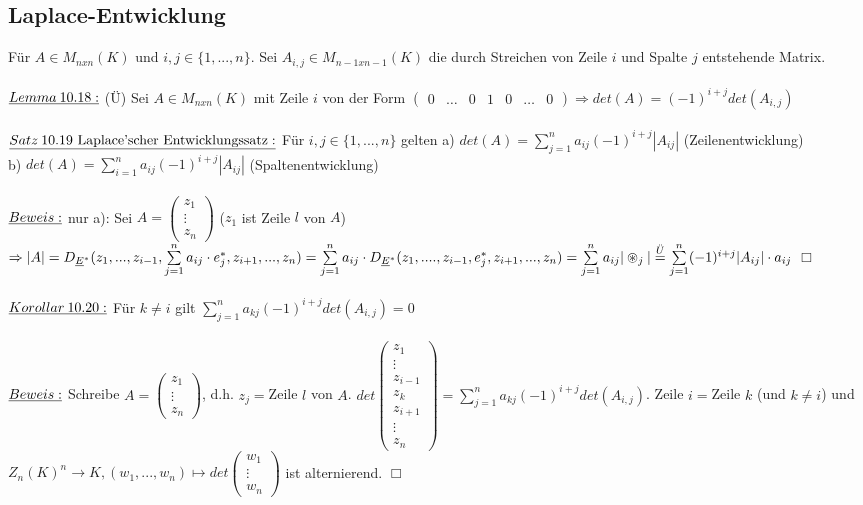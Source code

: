 \documentclass[fleqn, a4paper, 11pt]{article}
\begin{document}
\subsection{Laplace-Entwicklung}

F\"ur $A\in M_{nxn}(K)$ und $i,j\in\{1,...,n\}$. Sei $A_{i,j}\in M_{n-1xn-1}(K)$ die durch Streichen von Zeile $i$ und Spalte $j$ entstehende Matrix.\\
\\
$\uline{Lemma\:10.18:}$ (\"U) Sei $A\in M_{nxn}(K)$ mit Zeile $i$ von der Form $\begin{pmatrix}
	0 & \dots & 0 & 1 & 0 & \dots & 0
\end{pmatrix}\Rightarrow det(A)=(-1)^{i+j}det(A_{i,j})$\\
\\
$\uline{Satz\:10.19\text{ Laplace'scher Entwicklungssatz}:}$ F\"ur $i,j\in\{1,...,n\}$ gelten a) $det(A)=\sum\limits_{j=1}^n a_{ij}(-1)^{i+j}|A_{ij}|$ (Zeilenentwicklung)\\
b) $det(A)=\sum\limits_{i=1}^n a_{ij}(-1)^{i+j}|A_{ij}|$ (Spaltenentwicklung)\\
\\
$\uline{Beweis:}$ nur a): Sei $A=\begin{pmatrix}
	z_1\\
	\vdots\\
	z_n
\end{pmatrix}$ ($z_1$ ist Zeile $l$ von $A$)$\Rightarrow |A|=D_{\uline{E}^{\ast}}(z_1,...,z_{i-1},\sum\limits_{j=1}^n a_{ij}\cdot e_j^{\ast},z_{i+1},...,z_n)=\sum\limits_{j=1}^n a_{ij}\cdot D_{\uline{E}^{\ast}}(z_1,....,z_{i-1},e_j^{\ast},z_{i+1},...,z_n)=\sum\limits_{j=1}^n a_{ij}|\circledast_j |\stackrel{\ddot{U}}{=}\sum\limits_{j=1}^n (-1)^{i+j}|A_{ij}|\cdot a_{ij}$ \hfill $\Box$\\
\\
$\uline{Korollar\:10.20:}$ F\"ur $k\neq i$ gilt  $\sum\limits_{j=1}^n a_{kj}(-1)^{i+j}det(A_{i,j})=0$\\
\\
$\uline{Beweis:}$ Schreibe $A=\begin{pmatrix}
	z_1\\
	\vdots\\
	z_n
\end{pmatrix}$, d.h. $z_j=$Zeile $l$ von $A$. $det\begin{pmatrix}
	z_1\\
	\vdots\\
	z_{i-1}\\
	z_k\\
	z_{i+1}\\
	\vdots\\
	z_n
\end{pmatrix}=\sum\limits_{j=1}^n a_{kj}(-1)^{i+j}det(A_{i,j})$. Zeile $i=$Zeile $k$ (und $k\neq i$) und $Z_n(K)^n\rightarrow K,(w_1,...,w_n)\mapsto det\begin{pmatrix}
	w_1\\
	\vdots\\
	w_n
\end{pmatrix}$ ist alternierend. \hfill $\Box$\\
\end{document}
